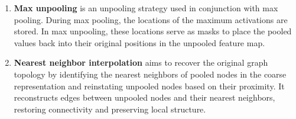 \begin{enumerate}
\item \textbf{Max unpooling} is an unpooling strategy used in conjunction with max pooling. During max pooling, the locations of the maximum activations are stored. In max unpooling, these locations serve as masks to place the pooled values back into their original positions in the unpooled feature map.
\item \textbf{Nearest neighbor interpolation} aims to recover the original graph topology by identifying the nearest neighbors of pooled nodes in the coarse representation and reinstating unpooled nodes based on their proximity. It reconstructs edges between unpooled nodes and their nearest neighbors, restoring connectivity and preserving local structure.
\end{enumerate}
